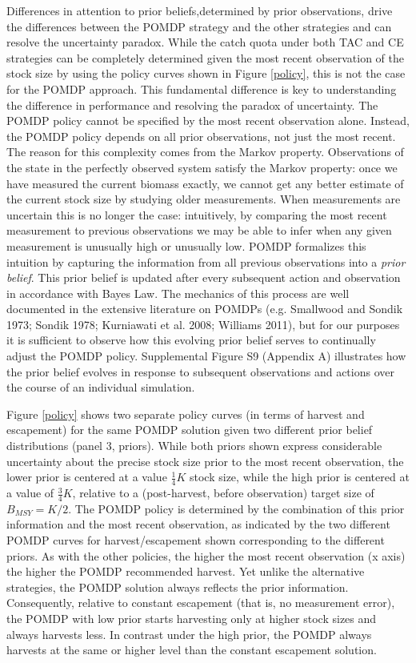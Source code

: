 \documentclass[3p]{elsarticle} %
\begin{document}
Differences in attention to prior beliefs,determined by prior
observations, drive the differences between the POMDP strategy and the
other strategies and can resolve the uncertainty paradox. While the
catch quota under both TAC and CE strategies can be completely
determined given the most recent observation of the stock size by using
the policy curves shown in Figure \ref{policy}, this is not the case for
the POMDP approach. This fundamental difference is key to understanding
the difference in performance and resolving the paradox of uncertainty.
The POMDP policy cannot be specified by the most recent observation
alone. Instead, the POMDP policy depends on all prior observations, not
just the most recent. The reason for this complexity comes from the
Markov property. Observations of the state in the perfectly observed
system satisfy the Markov property: once we have measured the current
biomass exactly, we cannot get any better estimate of the current stock
size by studying older measurements. When measurements are uncertain
this is no longer the case: intuitively, by comparing the most recent
measurement to previous observations we may be able to infer when any
given measurement is unusually high or unusually low. POMDP formalizes
this intuition by capturing the information from all previous
observations into a \emph{prior belief}. This prior belief is updated
after every subsequent action and observation in accordance with Bayes
Law. The mechanics of this process are well documented in the extensive
literature on POMDPs (e.g. Smallwood and Sondik 1973; Sondik 1978;
Kurniawati et al. 2008; Williams 2011), but for our purposes it is
sufficient to observe how this evolving prior belief serves to
continually adjust the POMDP policy. Supplemental Figure S9 (Appendix A)
illustrates how the prior belief evolves in response to subsequent
observations and actions over the course of an individual simulation.

Figure \ref{policy} shows two separate policy curves (in terms of
harvest and escapement) for the same POMDP solution given two different
prior belief distributions (panel 3, priors). While both priors shown
express considerable uncertainty about the precise stock size prior to
the most recent observation, the lower prior is centered at a value
\(\tfrac{1}{4}K\) stock size, while the high prior is centered at a
value of \(\tfrac{3}{4}K\), relative to a (post-harvest, before
observation) target size of \(B_{MSY} = K/2\). The POMDP policy is
determined by the combination of this prior information and the most
recent observation, as indicated by the two different POMDP curves for
harvest/escapement shown corresponding to the different priors. As with
the other policies, the higher the most recent observation (x axis) the
higher the POMDP recommended harvest. Yet unlike the alternative
strategies, the POMDP solution always reflects the prior information.
Consequently, relative to constant escapement (that is, no measurement
error), the POMDP with low prior starts harvesting only at higher stock
sizes and always harvests less. In contrast under the high prior, the
POMDP always harvests at the same or higher level than the constant
escapement solution.
\end{document}
